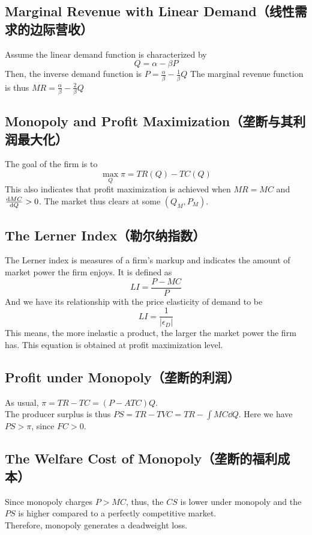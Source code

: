 \subsection{Marginal Revenue with Linear Demand（线性需求的边际营收）}
Assume the linear demand function is characterized by
$$Q = \alpha - \beta P$$
Then, the inverse demand function is $P = \frac{\alpha}{\beta} - \frac{1}{\beta} Q$
The marginal revenue function is thus $MR = \frac{\alpha}{\beta} - \frac{2}{\beta} Q$

\subsection{Monopoly and Profit Maximization（垄断与其利润最大化）}
The goal of the firm is to
$$\max_Q \pi = TR(Q) - TC(Q)$$
This also indicates that profit maximization is achieved when $MR = MC$ and $\dv{MC}{Q} > 0$. The market thus clears at some $(Q_M, P_M)$.

\subsection{The Lerner Index（勒尔纳指数）}
The Lerner index is measures of a firm's markup and indicates the amount of market power the firm enjoys. It is defined as
$$LI = \frac{P - MC}{P}$$
And we have its relationship with the price elasticity of demand to be
$$LI = \frac{1}{|\epsilon_D|}$$
This means, the more inelastic a product, the larger the market power the firm has. This equation is obtained at profit maximization level.

\subsection{Profit under Monopoly（垄断的利润）}
As usual, $\pi = TR - TC = (P - ATC)Q$. \\
The producer surplus is thus $PS = TR - TVC = TR - \int MC \dd Q$. Here we have $PS > \pi$, since $FC > 0$.

\subsection{The Welfare Cost of Monopoly（垄断的福利成本）}
Since monopoly charges $P > MC$, thus, the $CS$ is lower under monopoly and the $PS$ is higher compared to a perfectly competitive market. \\
Therefore, monopoly generates a deadweight loss.

\newpage